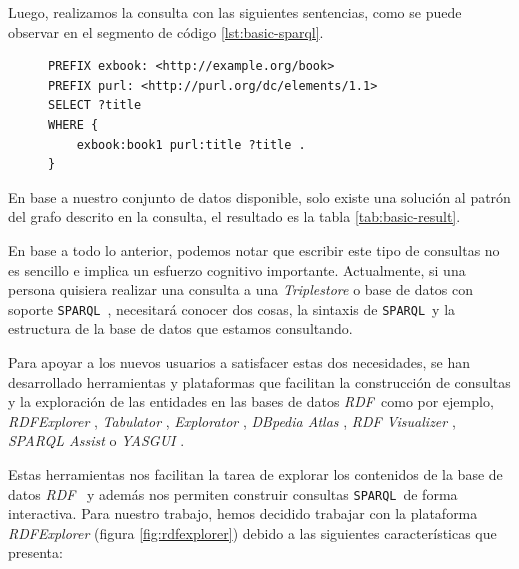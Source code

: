 \documentclass[conference,compsoc]{IEEEtran}
\newcommand{\rdf}{\textit{RDF}\ }
\newcommand{\spql}{\texttt{SPARQL}\ }
\begin{document}
Luego, realizamos la consulta con las siguientes sentencias, como se puede observar en
el segmento de código \ref{lst:basic-sparql}.

\begin{figure}
    \begin{lstlisting}[captionpos=b, caption=Consulta SPARQL basica., label=lst:basic-sparql, basicstyle=\ttfamily, frame=single]
PREFIX exbook: <http://example.org/book>
PREFIX purl: <http://purl.org/dc/elements/1.1>
SELECT ?title
WHERE {
    exbook:book1 purl:title ?title .
}
     \end{lstlisting}
\end{figure}

En base a nuestro conjunto de datos disponible, solo existe una
solución al patrón del grafo descrito en la consulta, el resultado es la tabla \ref{tab:basic-result}.

\begin{table}[h]
    \label{tab:basic-result}
    \caption{Resultado de una consulta SPARQL básica}
    \centering
\end{table}

En base a todo lo anterior, podemos notar que escribir este tipo de consultas no es
sencillo e implica un esfuerzo cognitivo importante. Actualmente, si una persona
quisiera realizar una consulta a una \textit{Triplestore} o base de datos con soporte \spql, necesitará
conocer dos cosas, la sintaxis de \spql y la estructura de la base de datos que estamos
consultando.

Para apoyar a los nuevos usuarios a satisfacer estas dos necesidades, se han desarrollado
herramientas y plataformas que facilitan la construcción de consultas y la exploración
de las entidades en las bases de datos \rdf como por ejemplo, \textit{RDFExplorer}
\cite{vargas2019rdf}, \textit{Tabulator} \cite{berners2006tabulator} , \textit{Explorator}
\cite{araujo2009experimenting}, \textit{DBpedia Atlas} \cite{valsecchi2015dbpedia},
\textit{RDF Visualizer} \cite{sayers2004node}, \textit{SPARQL Assist}
\cite{mccarthy2012sparql} o \textit{YASGUI} \cite{rietveld2017yasgui}.

Estas herramientas nos facilitan la tarea de explorar los contenidos de la base de datos \rdf
y además nos permiten construir consultas \spql de forma interactiva. Para nuestro trabajo,
hemos decidido trabajar con la plataforma \textit{RDFExplorer} (figura \ref{fig:rdfexplorer}) debido a las siguientes
características que presenta:
\end{document}
